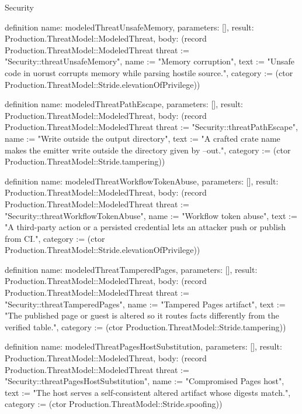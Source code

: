 \begin{lexlean}{Security}
\begin{semanticmodule}
definition{
  name: modeledThreatUnsafeMemory,
  parameters: [],
  result: Production.ThreatModel::ModeledThreat,
  body: (record Production.ThreatModel::ModeledThreat {threat := "Security::threatUnsafeMemory", name := "Memory corruption", text := "Unsafe code in uorust corrupts memory while parsing hostile source.", category := (ctor Production.ThreatModel::Stride.elevationOfPrivilege)})
}

definition{
  name: modeledThreatPathEscape,
  parameters: [],
  result: Production.ThreatModel::ModeledThreat,
  body: (record Production.ThreatModel::ModeledThreat {threat := "Security::threatPathEscape", name := "Write outside the output directory", text := "A crafted crate name makes the emitter write outside the directory given by --out.", category := (ctor Production.ThreatModel::Stride.tampering)})
}

definition{
  name: modeledThreatWorkflowTokenAbuse,
  parameters: [],
  result: Production.ThreatModel::ModeledThreat,
  body: (record Production.ThreatModel::ModeledThreat {threat := "Security::threatWorkflowTokenAbuse", name := "Workflow token abuse", text := "A third-party action or a persisted credential lets an attacker push or publish from CI.", category := (ctor Production.ThreatModel::Stride.elevationOfPrivilege)})
}

definition{
  name: modeledThreatTamperedPages,
  parameters: [],
  result: Production.ThreatModel::ModeledThreat,
  body: (record Production.ThreatModel::ModeledThreat {threat := "Security::threatTamperedPages", name := "Tampered Pages artifact", text := "The published page or guest is altered so it routes facts differently from the verified table.", category := (ctor Production.ThreatModel::Stride.tampering)})
}

definition{
  name: modeledThreatPagesHostSubstitution,
  parameters: [],
  result: Production.ThreatModel::ModeledThreat,
  body: (record Production.ThreatModel::ModeledThreat {threat := "Security::threatPagesHostSubstitution", name := "Compromised Pages host", text := "The host serves a self-consistent altered artifact whose digests match.", category := (ctor Production.ThreatModel::Stride.spoofing)})
}


\end{semanticmodule}
\end{lexlean}
